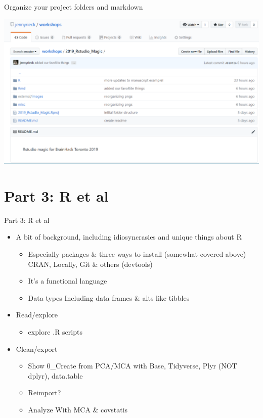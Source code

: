 \documentclass[
  ignorenonframetext,
]{beamer}
\providecommand{\tightlist}{%
  \setlength{\itemsep}{0pt}\setlength{\parskip}{0pt}}
\begin{document}
\begin{frame}{Organize your project folders and markdown}
\protect\hypertarget{organize-your-project-folders-and-markdown-1}{}

\includegraphics{../external/images/setup_5_git.PNG}

\end{frame}

\hypertarget{part-3-r-et-al}{%
\section{Part 3: R et al}\label{part-3-r-et-al}}

\begin{frame}{Part 3: R et al}
\protect\hypertarget{part-3-r-et-al-1}{}

\begin{itemize}
\tightlist
\item
  A bit of background, including idiosyncrasies and unique things about
  R

  \begin{itemize}
  \tightlist
  \item
    Especially packages \& three ways to install (somewhat covered
    above) CRAN, Locally, Git \& others (devtools)
  \item
    It's a functional language
  \item
    Data types Including data frames \& alts like tibbles
  \end{itemize}
\item
  Read/explore

  \begin{itemize}
  \tightlist
  \item
    explore .R scripts
  \end{itemize}
\item
  Clean/export

  \begin{itemize}
  \tightlist
  \item
    Show 0\_Create from PCA/MCA with Base, Tidyverse, Plyr (NOT dplyr),
    data.table
  \item
    Reimport?
  \item
    Analyze With MCA \& covstatis
  \end{itemize}
\end{itemize}

\end{frame}
\end{document}
